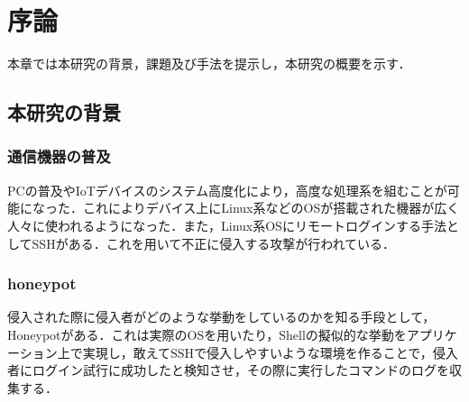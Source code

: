 \chapter{序論}
\label{intr}

本章では本研究の背景，課題及び手法を提示し，本研究の概要を示す．

\section{本研究の背景}

\subsection{通信機器の普及}
\label{intr:back}
PCの普及やIoTデバイスのシステム高度化により，高度な処理系を組むことが可能になった．これによりデバイス上にLinux系などのOSが搭載された機器が広く人々に使われるようになった．また，Linux系OSにリモートログインする手法としてSSHがある．これを用いて不正に侵入する攻撃が行われている．

\subsection{honeypot}
\label{intr:honey}
 侵入された際に侵入者がどのような挙動をしているのかを知る手段として，Honeypotがある．これは実際のOSを用いたり，Shellの擬似的な挙動をアプリケーション上で実現し，敢えてSSHで侵入しやすいような環境を作ることで，侵入者にログイン試行に成功したと検知させ，その際に実行したコマンドのログを収集する．

